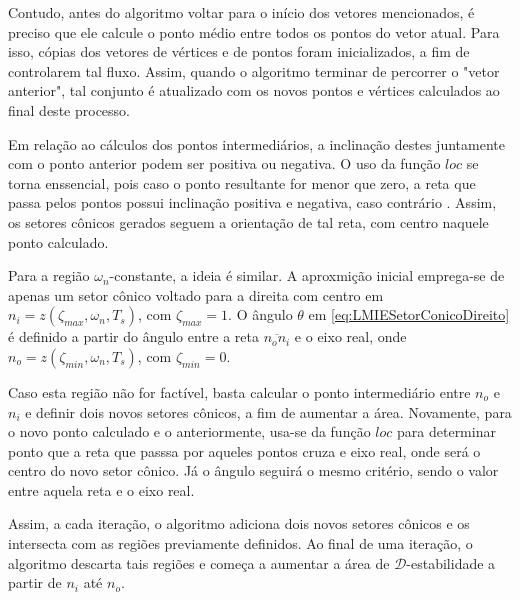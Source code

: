 Contudo, antes do algoritmo voltar para o início dos vetores mencionados, é preciso que ele calcule o ponto médio entre todos os pontos do vetor atual. Para isso, cópias dos vetores de vértices e de pontos foram inicializados, a fim de controlarem tal fluxo. Assim, quando o algoritmo terminar de percorrer o "vetor anterior", tal conjunto é atualizado com os novos pontos e vértices calculados ao final deste processo.

Em relação ao cálculos dos pontos intermediários, a inclinação destes juntamente com o ponto anterior podem ser positiva ou negativa. O uso da função $loc$ se torna enssencial, pois caso o ponto resultante for menor que zero, a reta que passa pelos pontos possui inclinação positiva e negativa, caso contrário \cite{WISNIEWSKI2019}. Assim, os setores cônicos gerados seguem a orientação de tal reta, com centro naquele ponto calculado.

Para a região $\omega_n$-constante, a ideia é similar. A aproxmição inicial emprega-se de apenas um setor cônico voltado para a direita com centro em $n_i = z(\zeta_{max},\omega_n,T_s)$, com $\zeta_{max} = 1$. O ângulo $\theta$ em \eqref{eq:LMIESetorConicoDireito} é definido a partir do ângulo entre a reta $\overline{n_on_i}$ e o eixo real, onde $n_o = z(\zeta_{min},\omega_n,T_s)$, com $\zeta_{min} = 0$.

Caso esta região não for factível, basta calcular o ponto intermediário entre $n_o$ e $n_i$ e definir dois novos setores cônicos, a fim de aumentar a área. Novamente, para o novo ponto calculado e o anteriormente, usa-se da função $loc$ para determinar ponto que a reta que passsa por aqueles pontos cruza e eixo real, onde será o centro do novo setor cônico. Já o ângulo seguirá o mesmo critério, sendo o valor entre aquela reta e o eixo real.

Assim, a cada iteração, o algoritmo adiciona dois novos setores cônicos e os intersecta com as regiões previamente definidos. Ao final de uma iteração, o algoritmo descarta tais regiões e começa a aumentar a área de $\mathscr{D}$-estabilidade a partir de $n_i$ até $n_o$.

\begin{figure}[!hb]
  \centering
  \begin{subfigure}[t]{0.2\columnwidth}
      
      \caption{}
      \label{subfig:AproximacaoPoligonalWn1}
  \end{subfigure}
  \begin{subfigure}[t]{0.2\columnwidth}
      
      \caption{}
      \label{subfig:AproximacaoPoligonalWn2}
  \end{subfigure}
  \begin{subfigure}[t]{0.2\columnwidth}
    
    \caption{}
    \label{subfig:AproximacaoPoligonalWn3}
  \end{subfigure}
  \begin{subfigure}[t]{0.2\columnwidth}
    
    \caption{}
    \label{subfig:AproximacaoPoligonalWn4}
  \end{subfigure}
  \caption{}
  \label{fig:AproximacoesPoligonalWn}
\end{figure}